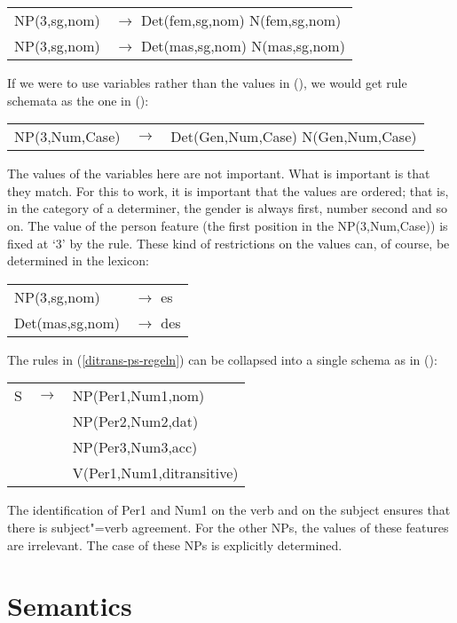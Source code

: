 \ea
\begin{tabular}[t]{@{}l@{ }l}
NP(3,sg,nom)  & $\to$ Det(fem,sg,nom) N(fem,sg,nom)\\
NP(3,sg,nom)  & $\to$ Det(mas,sg,nom) N(mas,sg,nom)\\
\end{tabular}
\z
If we were to use variables rather than the values in (), we would get rule schemata as the
one in ():
\ea
\label{Regel-mit-Variablen}
\begin{tabular}[t]{@{}l@{ }l@{ }l}
NP({3},{Num},{Case}) & $\to$ & Det(Gen,{Num},{Case}) N(Gen,{Num},{Case})\\
\end{tabular}
\z
The values of the variables here are not important. What is important is that they match. For this
to work, it is important that the values are ordered; that is, in the category of a determiner, the gender is always first, number
second and so on. The value of the person feature (the first position in the NP(3,Num,Case)) is fixed at `3' by the rule. These
kind of restrictions on the values can, of course, be determined in the lexicon: 
\ea
\begin{tabular}[t]{@{}l@{ }l}
NP(3,sg,nom)  & $\to$ es\\
Det(mas,sg,nom)  & $\to$ des\\
\end{tabular}
\z

\noindent
The rules in (\ref{ditrans-ps-regeln})  can be collapsed into a single schema as in ():
\ea
\label{ditrans-schema}
\begin{tabular}[t]{@{}l@{ }l@{ }l}
S  & $\to$ & NP({Per1},{Num1},{nom}) \\
   &       & NP(Per2,Num2,{dat})\\
   &       & NP(Per3,Num3,{acc})\\
   &       & V({Per1},{Num1},ditransitive)\\
\end{tabular}
\z
The identification of Per1 and Num1 on the verb and on the subject ensures that there is subject"=verb agreement.
For the other NPs, the values of these features are irrelevant. The case of these NPs is explicitly determined.

\section{Semantics}
\label{sec-PSG-Semantik}

